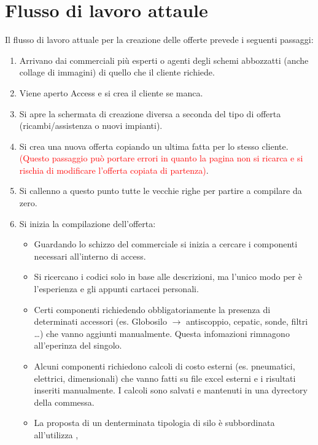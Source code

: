 \documentclass[12pt, a4paper]{article} %
\begin{document}
\section{Flusso di lavoro attaule}
Il flusso di lavoro attuale per la creazione delle offerte prevede i seguenti
passaggi:
\begin{enumerate}
      \item Arrivano dai commerciali più esperti o agenti degli schemi abbozzatti (anche
            collage di immagini) di quello che il cliente richiede.
      \item Viene aperto Access e si crea il cliente se manca.
      \item Si apre la schermata di creazione diversa a seconda del tipo di offerta
            (ricambi/assistenza o nuovi impianti).
      \item Si crea una nuova offerta copiando un ultima fatta per lo stesso cliente.
            \textcolor{red}{(Questo passaggio può portare errori in quanto la pagina non si
                  ricarca e si rischia di modificare l'offerta copiata di partenza)}.
      \item Si callenno a questo punto tutte le vecchie righe per partire a compilare da
            zero.
      \item Si inizia la compilazione dell'offerta:
            \begin{itemize}
                  \item Guardando lo schizzo del commerciale si inizia a cercare i componenti necessari
                        all'interno di access.
                  \item Si ricercano i codici solo in base alle descrizioni, ma l'unico modo per è
                        l'esperienza e gli appunti cartacei personali.
                  \item Certi componenti richiedendo obbligatoriamente la presenza di determinati
                        accessori (es. Globosilo $\rightarrow$ antiscoppio, cepatic, sonde, filtri
                        \dots) che vanno aggiunti manualmente. Questa infomazioni rimnagono
                        all'eperinza del singolo.
                  \item Alcuni componenti richiedono calcoli di costo esterni (es. pneumatici,
                        elettrici, dimensionali) che vanno fatti su file excel esterni e i risultati
                        inseriti manualmente.
                        I calcoli sono salvati e mantenuti in una dyrectory della commessa.
                  \item La proposta di un denterminata tipologia di silo è subbordinata all'utilizza ,

\end{itemize}
\end{enumerate}
\end{document}
